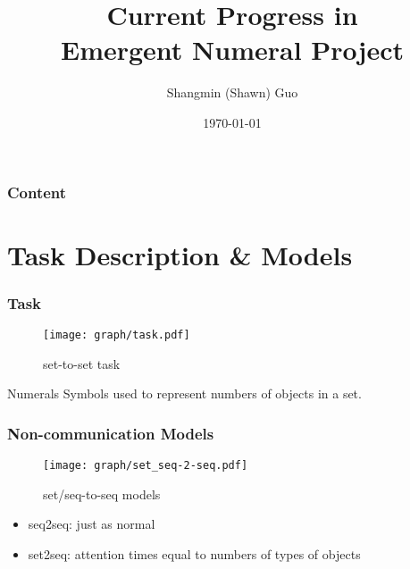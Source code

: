 \documentclass[compress,mathserif,xcolor=dvipsnames,svgnames,aspectratio=43]{beamer}
\begin{document}
\title{\huge{Current Progress in \\ Emergent Numeral Project}\\\medskip
    \large\textcolor{beautyblue}{} \medskip}
\author[{Shangmin (Shawn) Guo}]{\textcolor{grizoo}{Shangmin (Shawn) Guo}}
\date[someday\ldots]{\today}%

\begin{frame}
\titlepage
\end{frame}

\begin{frame}
\frametitle{Content}
\tableofcontents
\end{frame}

\section{Task Description \& Models}

\begin{frame}[c]
  \frametitle{Task}
  \begin{figure}[!ht]
    \centering
    \texttt{[image: graph/task.pdf]}
    \caption{set-to-set task}
    \label{fig:1task}
  \end{figure}
  \begin{block}{Numerals}
    Symbols used to represent numbers of objects in a set.
  \end{block}
\end{frame}

\begin{frame}[c]
  \frametitle{Non-communication Models}
  \begin{figure}[!ht]
    \centering
    \texttt{[image: graph/set\_seq-2-seq.pdf]}
    \caption{set/seq-to-seq models}
    \label{fig:2set_seq2seq}
  \end{figure}
  \begin{itemize}
    \item seq2seq: just as normal
    \item set2seq: attention times equal to numbers of types of objects
  \end{itemize}
\end{frame}
\end{document}

